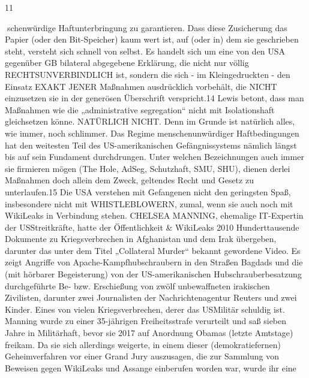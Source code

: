 \begin{multicols}{2}
11

schenwürdige Haftunterbringung zu garantieren. Dass
diese Zusicherung das Papier (oder den Bit-Speicher)
kaum wert ist, auf (oder in) dem sie geschrieben steht,
versteht sich schnell von selbst. Es handelt sich um eine
von den USA gegenüber GB bilateral abgegebene Erklärung, die nicht nur völlig RECHTSUNVERBINDLICH
ist, sondern die sich - im Kleingedruckten - den Einsatz
EXAKT JENER Maßnahmen ausdrücklich vorbehält, die
NICHT einzusetzen sie in der generösen Überschrift verspricht.14
Lewis betont, dass man Maßnahmen wie die „administrative segregation“ nicht mit Isolationshaft gleichsetzen
könne. NATÜRLICH NICHT. Denn im Grunde ist natürlich alles, wie immer, noch schlimmer. Das Regime menschenunwürdiger Haftbedingungen hat den weitesten
Teil des US-amerikanischen Gefängnissystems nämlich
längst bis auf sein Fundament durchdrungen. Unter
welchen Bezeichnungen auch immer sie firmieren mögen (The Hole, AdSeg, Schutzhaft, SMU, SHU), dienen
derlei Maßnahmen doch allein dem Zweck, geltendes
Recht und Gesetz zu unterlaufen.15
Die USA verstehen mit Gefangenen nicht den geringsten
Spaß, insbesondere nicht mit WHISTLEBLOWERN, zumal, wenn sie auch noch mit WikiLeaks in Verbindung
stehen.
CHELSEA MANNING, ehemalige IT-Expertin der USStreitkräfte, hatte der Öffentlichkeit \& WikiLeaks 2010
Hunderttausende Dokumente zu Kriegsverbrechen in
Afghanistan und dem Irak übergeben, darunter das unter dem Titel „Collateral Murder“ bekannt gewordene Video. Es zeigt Angriffe von Apache-Kampfhubschraubern
in den Straßen Bagdads und die (mit hörbarer Begeisterung) von der US-amerikanischen Hubschrauberbesatzung durchgeführte Be- bzw. Erschießung von zwölf
unbewaffneten irakischen Zivilisten, darunter zwei Journalisten der Nachrichtenagentur Reuters und zwei Kinder. Eines von vielen Kriegsverbrechen, derer das USMilitär schuldig ist.
Manning wurde zu einer 35-jährigen Freiheitsstrafe verurteilt und saß sieben Jahre in Militärhaft, bevor sie 2017
auf Anordnung Obamas (letzte Amtstage) freikam. Da
sie sich allerdings weigerte, in einem dieser (demokratiefernen) Geheimverfahren vor einer Grand Jury auszusagen, die zur Sammlung von Beweisen gegen WikiLeaks und Assange einberufen worden war, wurde ihr eine


\end{multicols}
